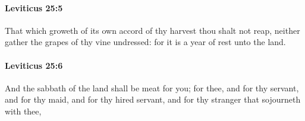 		\paragraph{Leviticus 25:5} %
			\label{LEVITICUS-25-5}

			That which groweth of its own accord of thy harvest thou shalt not reap, neither gather the grapes of thy vine undressed: for it is a year of rest unto the land.


		\paragraph{Leviticus 25:6} %
			\label{LEVITICUS-25-6}

			And the sabbath of the land shall be meat for you; for thee, and for thy servant, and for thy maid, and for thy hired servant, and for thy stranger that sojourneth with thee,



